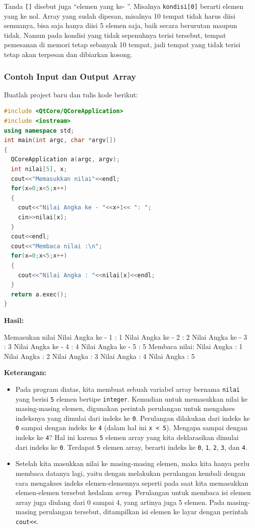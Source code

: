 Tanda \texttt{{[}{]}} disebut juga ``elemen yang ke- ''. Misalnya
\texttt{kondisi{[}0{]}} berarti elemen yang ke nol. Array yang sudah
dipesan, misalnya 10 tempat tidak harus diisi semuanya, bisa saja hanya
diisi 5 elemen saja, baik secara berurutan maupun tidak. Namun pada
kondisi yang tidak sepenuhnya terisi tersebut, tempat pemesanan di
memori tetap sebanyak 10 tempat, jadi tempat yang tidak terisi tetap
akan terpesan dan dibiarkan kosong.

\subsubsection*{Contoh  Input dan Output Array}

Buatlah project baru dan tulis kode berikut:

\begin{lstlisting}[language=c++, caption=Input dan Output Array, label=contoh3-1]
#include <QtCore/QCoreApplication>
#include <iostream>
using namespace std;
int main(int argc, char *argv[])
{
  QCoreApplication a(argc, argv);
  int nilai[5], x;
  cout<<"Memasukkan nilai"<<endl;
  for(x=0;x<5;x++)
  {
    cout<<"Nilai Angka ke - "<<x+1<< ": ";
    cin>>nilai[x];
  }
  cout<<endl;
  cout<<"Membaca nilai :\n";
  for(x=0;x<5;x++)
  {
    cout<<"Nilai Angka : "<<nilai[x]<<endl;
  }
  return a.exec();
}
\end{lstlisting}

\textbf{Hasil:}
\begin{lcverbatim}
Memasukan nilai
Nilai Angka ke - 1 : 1
Nilai Angka ke - 2 : 2
Nilai Angka ke - 3 : 3
Nilai Angka ke - 4 : 4
Nilai Angka ke - 5 : 5
Membaca nilai:
Nilai Angka : 1
Nilai Angka : 2
Nilai Angka : 3
Nilai Angka : 4
Nilai Angka : 5
\end{lcverbatim}

\textbf{Keterangan:}

\begin{itemize}
\item
  Pada program diatas, kita membuat sebuah variabel array bernama
  \texttt{nilai} yang berisi \texttt{5} elemen bertipe \texttt{integer}.
  Kemudian untuk memasukkan nilai ke masing-masing elemen, digunakan
  perintah perulangan untuk mengakses indeksnya yang dimulai dari indeks
  ke \texttt{0}. Perulangan dilakukan dari indeks ke \texttt{0} sampai
  dengan indeks ke \texttt{4} (dalam hal ini
  \texttt{x\ \textless{}\ 5}). Mengapa sampai dengan indeks ke
  \texttt{4}? Hal ini karena \texttt{5} elemen array yang kita
  deklarasikan dimulai dari indeks ke \texttt{0}. Terdapat \texttt{5}
  elemen array, berarti indeks ke \texttt{0}, \texttt{1}, \texttt{2},
  \texttt{3}, dan \texttt{4}.
\item
  Setelah kita masukkan nilai ke masing-masing elemen, maka kita hanya
  perlu membaca datanya lagi, yaitu dengan melakukan perulangan kembali
  dengan cara mengakses indeks elemen-elemennya seperti pada saat kita
  memasukkan elemen-elemen tersebut kedalam \emph{array}. Perulangan
  untuk membaca isi elemen array juga diulang dari 0 sampai 4, yang
  artinya juga 5 elemen. Pada masing-masing perulangan tersebut,
  ditampilkan isi elemen ke layar dengan perintah
  \texttt{cout\textless{}\textless{}}.
\end{itemize}

